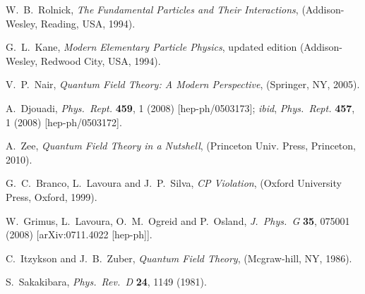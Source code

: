 \documentclass{ws-ijmpa}
\begin{document}
\begin{thebibliography}{00}
W.~B.~Rolnick,
\textit{The Fundamental Particles and Their Interactions},
(Addison-Wesley, Reading, USA, 1994).

G.~L.~Kane,
\textit{Modern Elementary Particle Physics},
updated edition (Addison-Wesley, Redwood City, USA, 1994).

V.~P.~Nair,
\textit{Quantum Field Theory: A Modern Perspective},
(Springer, NY, 2005).

A.~Djouadi,
\textit{Phys.\ Rept.} {\bf 459}, 1 (2008)  [hep-ph/0503173];
\textit{ibid},
\textit{Phys.\ Rept.}  {\bf 457}, 1 (2008)  [hep-ph/0503172].

A.~Zee,
\textit{Quantum Field Theory in a Nutshell},
(Princeton Univ. Press, Princeton, 2010).


 G.~C.~Branco, L.~Lavoura and J.~P.~Silva,
 \textit{CP Violation},
(Oxford University Press, Oxford, 1999).

W.~Grimus, L.~Lavoura, O.~M.~Ogreid and P.~Osland,
\textit{J.\ Phys.\ G} \textbf{35}, 075001 (2008)
[arXiv:0711.4022 [hep-ph]].


C.~Itzykson and J.~B.~Zuber,
\textit{Quantum Field Theory},
(Mcgraw-hill, NY, 1986).


S.~Sakakibara,
\textit{Phys.\ Rev.\ D} \textbf{24}, 1149 (1981).



\end{thebibliography}
\end{document}
